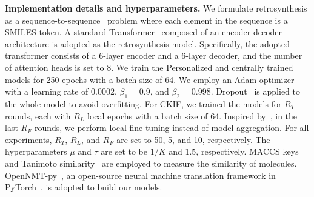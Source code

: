 \noindent\textbf{Implementation details and hyperparameters.} We formulate retrosynthesis as a sequence-to-sequence~\citep{sutskever2014sequence} problem where each element in the sequence is a SMILES token.  A standard Transformer~\citep{vaswani2017attention} composed of an encoder-decoder architecture is adopted as the retrosynthesis model.  Specifically, the adopted transformer consists of a 6-layer encoder and a 6-layer decoder, and the number of attention heads is set to 8. We train the Personalized and centrally trained models for 250 epochs with a batch size of 64. We employ an Adam optimizer~\citep{kingma2014adam} with a learning rate of 0.0002, $\beta_1= 0.9$, and $\beta_2= 0.998$. Dropout~\citep{srivastava2014dropout} is applied to the whole model to avoid overfitting. For CKIF,  we trained the models for $R_T$ rounds, each with $R_L$ local epochs with a batch size of 64. Inspired by~\citep{wang2019federated,yu2020salvaging}, in the last $R_F$ rounds, we perform local fine-tuning instead of model aggregation. For all experiments, $R_T$, $R_L$, and $R_F$ are set to 50, 5, and 10, respectively. The hyperparameters $\mu$ and $\tau$ are set to be $1 / K $ and 1.5, respectively. MACCS keys~\citep{durant2002reoptimization} and Tanimoto similarity~\citep{bajusz2015tanimoto} are employed to measure the similarity of molecules. OpenNMT-py~\citep{klein2017opennmt}, an open-source neural machine translation framework in PyTorch~\citep{paszke2019pytorch}, is adopted to build our models.

